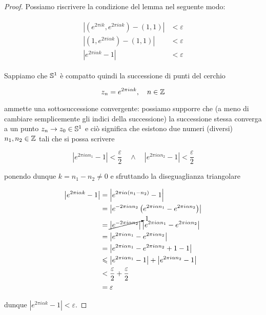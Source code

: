 \begin{proof}
	Possiamo riscrivere la condizione del lemma nel seguente modo:
	
	\begin{align}
		\begin{split}
			\left| (e^{2 \pi i k}, e^{2 \pi i \alpha k}) - (1,1) \right| &< \varepsilon \\
			\left| (1, e^{2 \pi i \alpha k}) - (1,1) \right| &< \varepsilon \\
			\left| e^{2 \pi i \alpha k} - 1 \right| &< \varepsilon
		\end{split}
	\end{align}

	Sappiamo che $ \S^{1} $ è compatto quindi la successione di punti del cerchio
	
	\begin{equation}
		z_{n} = e^{2 \pi i \alpha k} \qcomma n \in \Z
	\end{equation}

	ammette una sottosuccessione convergente: possiamo supporre che (a meno di cambiare semplicemente gli indici della successione) la successione stessa converga a un punto $ z_{n} \to z_{0} \in \S^{1} $ e ciò significa che esistono due numeri (diversi) $ n_{1},n_{2} \in \Z $ tali che si possa scrivere
	
	\begin{equation}
		\left| e^{2 \pi i \alpha n_{1}} - 1 \right| < \dfrac{\varepsilon}{2} %
		\quad \wedge \quad %
		\left| e^{2 \pi i \alpha n_{2}} - 1 \right| < \dfrac{\varepsilon}{2}
	\end{equation}

	ponendo dunque $ k = n_{1} - n_{2} \neq 0 $ e sfruttando la diseguaglianza triangolare
	
	\begin{align}
		\begin{split}
			\left| e^{2 \pi i \alpha k} - 1 \right| &= \left| e^{2 \pi i \alpha (n_{1} - n_{2})} - 1 \right| \\
			&= \left| e^{ -2 \pi i \alpha n_{2}} \left( e^{2 \pi i \alpha n_{1}} - e^{2 \pi i \alpha n_{2}} \right) \right| \\
			&= \cancelto{1}{ \left| e^{ -2 \pi i \alpha n_{2}} \right| } \left| e^{2 \pi i \alpha n_{1}} - e^{2 \pi i \alpha n_{2}} \right| \\
			&= \left| e^{2 \pi i \alpha n_{1}} - e^{2 \pi i \alpha n_{2}} \right| \\
			&= \left| e^{2 \pi i \alpha n_{1}} - e^{2 \pi i \alpha n_{2}} +1 -1 \right| \\
			&\leqslant \left| e^{2 \pi i \alpha n_{1}} - 1 \right| + \left| e^{2 \pi i \alpha n_{2}} - 1 \right| \\
			&< \dfrac{\varepsilon}{2} + \dfrac{\varepsilon}{2} \\
			&= \varepsilon
		\end{split}
	\end{align}

	dunque $ \left| e^{2 \pi i \alpha k} - 1 \right| < \varepsilon $.
\end{proof}

